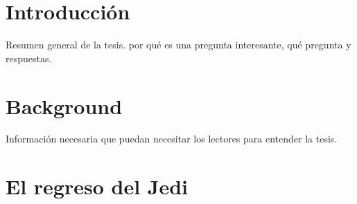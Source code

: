 \documentclass[11pt,a4paper,twoside]{tesis}
\begin{document}

\def\autor{Fernando Gasperi Jabalera}
\def\tituloTesis{Refactorings automáticos de alto nivel}
\def\runtitulo{Refactorings automáticos de alto nivel}
\def\runtitle{High level automated refactorings}
\def\director{Hernán Wilkinson}
\def\lugar{Buenos Aires, 2020}


\frontmatter
\pagestyle{empty}


\cleardoublepage

\cleardoublepage

\cleardoublepage

\cleardoublepage
\tableofcontents

\mainmatter
\pagestyle{headings}


\chapter{Introducción}
Resumen general de la tesis. por qué es una pregunta interesante, qué pregunta y respuestas.


\chapter{Background}
Información necesaria que puedan necesitar los lectores para entender la tesis.


\chapter{El regreso del Jedi}

\backmatter
%
\end{document}
